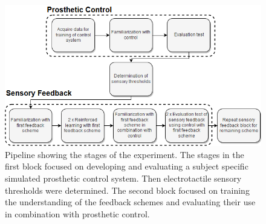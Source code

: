 \begin{figure}[H]                 
	\includegraphics[width=1\textwidth]{figures/std_paper}
	\caption{Pipeline showing the stages of the experiment. The stages in the first block focused on developing and evaluating a subject specific simulated prosthetic control system. Then electrotactile sensory thresholds were determined. The second block focused on training the understanding of the feedback schemes and evaluating their use in combination with prosthetic control.}
	\label{fig:pa:std_pap} 
\end{figure}


